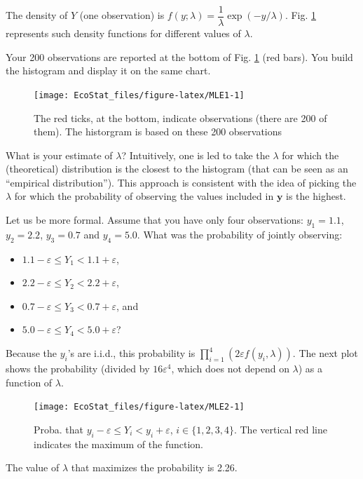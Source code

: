 \documentclass[
  12pt,
]{book}
\providecommand{\tightlist}{%
  \setlength{\itemsep}{0pt}\setlength{\parskip}{0pt}}
\theoremstyle{definition}
\theoremstyle{definition}
\theoremstyle{definition}
\theoremstyle{definition}
\theoremstyle{remark}
\begin{document}
The density of \(Y\) (one observation) is \(f(y;\lambda) = \dfrac{1}{\lambda}\exp(-y/\lambda)\). Fig. \ref{fig:MLE1} represents such density functions for different values of \(\lambda\).

Your 200 observations are reported at the bottom of Fig. \ref{fig:MLE1} (red bars). You build the histogram and display it on the same chart.

\begin{figure}
\texttt{[image: EcoStat\_files/figure-latex/MLE1-1]} \caption{The red ticks, at the bottom, indicate observations (there are 200 of them). The historgram is based on these 200 observations}\label{fig:MLE1}
\end{figure}

What is your estimate of \(\lambda\)? Intuitively, one is led to take the \(\lambda\) for which the (theoretical) distribution is the closest to the histogram (that can be seen as an ``empirical distribution''). This approach is consistent with the idea of picking the \(\lambda\) for which the probability of observing the values included in \(\mathbf{y}\) is the highest.

Let us be more formal. Assume that you have only four observations: \(y_1=1.1\), \(y_2=2.2\), \(y_3=0.7\) and \(y_4=5.0\). What was the probability of jointly observing:

\begin{itemize}
\tightlist
\item
  \(1.1-\varepsilon \le Y_1 < 1.1+\varepsilon\),
\item
  \(2.2-\varepsilon \le Y_2 < 2.2+\varepsilon\),
\item
  \(0.7-\varepsilon \le Y_3 < 0.7+\varepsilon\), and
\item
  \(5.0-\varepsilon \le Y_4 < 5.0+\varepsilon\)?
\end{itemize}

Because the \(y_i\)'s are i.i.d., this probability is \(\prod_{i=1}^4(2\varepsilon f(y_i,\lambda))\).
The next plot shows the probability (divided by \(16\varepsilon^4\), which does not depend on \(\lambda\)) as a function of \(\lambda\).

\begin{figure}
\texttt{[image: EcoStat\_files/figure-latex/MLE2-1]} \caption{Proba. that $y_i-\varepsilon \le Y_i < y_i+\varepsilon$, $i \in \{1,2,3,4\}$. The vertical red line indicates the maximum of the function.}\label{fig:MLE2}
\end{figure}

The value of \(\lambda\) that maximizes the probability is 2.26.
\end{document}
